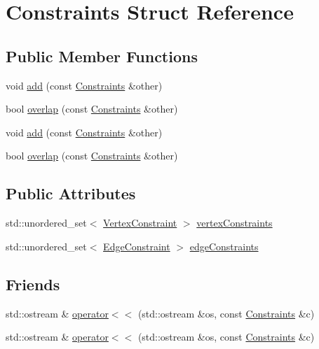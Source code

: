 \hypertarget{struct_constraints}{}\section{Constraints Struct Reference}
\label{struct_constraints}
\subsection*{Public Member Functions}
\begin{DoxyCompactItemize}
\item 
void \hyperlink{struct_constraints_ad1b2c1a4ecc72e8261a5ef55ba14747b}{add} (const \hyperlink{struct_constraints}{Constraints} \&other)
\item 
bool \hyperlink{struct_constraints_a26075165568016b81a1a2af36d8c6cce}{overlap} (const \hyperlink{struct_constraints}{Constraints} \&other)
\item 
void \hyperlink{struct_constraints_ad1b2c1a4ecc72e8261a5ef55ba14747b}{add} (const \hyperlink{struct_constraints}{Constraints} \&other)
\item 
bool \hyperlink{struct_constraints_a26075165568016b81a1a2af36d8c6cce}{overlap} (const \hyperlink{struct_constraints}{Constraints} \&other)
\end{DoxyCompactItemize}
\subsection*{Public Attributes}
\begin{DoxyCompactItemize}
\item 
std\+::unordered\+\_\+set$<$ \hyperlink{struct_vertex_constraint}{Vertex\+Constraint} $>$ \hyperlink{struct_constraints_a37939c965d84c37e5b4a52b6c5a2fd48}{vertex\+Constraints}
\item 
std\+::unordered\+\_\+set$<$ \hyperlink{struct_edge_constraint}{Edge\+Constraint} $>$ \hyperlink{struct_constraints_a26aec77e7e0f9352ffe6ed2e8d285d93}{edge\+Constraints}
\end{DoxyCompactItemize}
\subsection*{Friends}
\begin{DoxyCompactItemize}
\item 
std\+::ostream \& \hyperlink{struct_constraints_a609a032077973e41f300c88a62d8f6fa}{operator$<$$<$} (std\+::ostream \&os, const \hyperlink{struct_constraints}{Constraints} \&c)
\item 
std\+::ostream \& \hyperlink{struct_constraints_a609a032077973e41f300c88a62d8f6fa}{operator$<$$<$} (std\+::ostream \&os, const \hyperlink{struct_constraints}{Constraints} \&c)
\end{DoxyCompactItemize}



